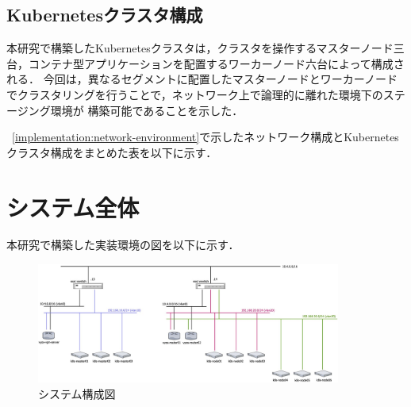 \subsection{Kubernetesクラスタ構成}
\label{implementation:kubernetes-environment}
本研究で構築したKubernetesクラスタは，クラスタを操作するマスターノード三台，コンテナ型アプリケーションを配置するワーカーノード六台によって構成される．
今回は，異なるセグメントに配置したマスターノードとワーカーノードでクラスタリングを行うことで，ネットワーク上で論理的に離れた環境下のステージング環境が
構築可能であることを示した．

~\ref{implementation:network-environment}で示したネットワーク構成とKubernetesクラスタ構成をまとめた表を以下に示す．

\section{システム全体}
\label{implementation:system}
本研究で構築した実装環境の図を以下に示す．

\begin{figure}[htbp]
\begin{center}
\includegraphics[width=100mm]{./figures/system-diagram.jpg}
\caption{システム構成図}
\end{center}
\end{figure}

